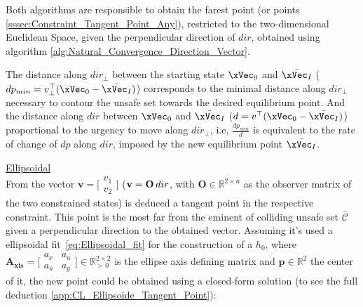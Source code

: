 Both algorithms are responsible to obtain the farest point (or points \ref{sssec:Constraint_Tangent_Point_Any}), restricted to the two-dimensional Euclidean Space, given the perpendicular direction of \(dir\), obtained using algorithm \ref{alg:Natural_Convergence_Direction_Vector}.\par
The distance along \(dir_{\perp}\) between the starting state \(\xVec_0\) and \(\bar{\xVec_I}\) (\(dp_{min} = v_{\perp}^{\top}(\xVec_0 - \bar{\xVec_I})\)) corresponds to the minimal distance along \(dir_{\perp}\) necessary to contour the unsafe set towards the desired equilibrium point. And the distance along \(dir\) between \(\xVec_0\) and \(\bar{\xVec_I}\) (\(d = v^{\top}(\xVec_0 - \bar{\xVec_I})\))  proportional to the urgency to move along \(dir_{\perp}\), i.e, \(\frac{dp_{min}}{d}\) is equivalent to the rate of change of \(dp\) along \(dir\), imposed by the new equilibrium point \(\bar{\xVec_I}\). %
 

\underline{Ellipsoidal}
\label{sssec:Constraint_Tangent_Point_Ellipsoidal} \\

From the vector \(\mathbf{v} = \bigl[\begin{smallmatrix} v_1\\ v_2 \end{smallmatrix} \bigr]\) (\(\mathbf{v} = \mathbf{O} \hspace{0.2em} dir\), with \(\mathbf{O} \in \mathbb{R}^{2 \times n}\) as the observer matrix of the two constrained states) is deduced a tangent point in the respective constraint. This point is the most far from the eminent of colliding unsafe set \(\bar{\mathcal{C}}\) given a perpendicular direction to the obtained vector.%
Assuming it's used a ellipsoidal fit~\eqref{eq:Ellipsoidal_fit} for the construction of a  \(h_0\), where \(\mathbf{A_{xis}} = \bigl[\begin{smallmatrix} a_x&a_u \\ a_u&a_y \end{smallmatrix} \bigr] \in \mathbb{R}^{2 \times 2}_{\succ 0}\) is the ellipse axis defining matrix and \(\mathbf{p} \in \mathbb{R}^{2}\) the center of it, the new point could be obtained using a closed-form solution (to see the full deduction \ref{app:CL_Ellipsoide_Tangent_Point}):


